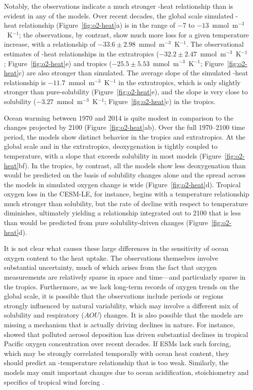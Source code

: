 \documentclass[draft,linenumbers]{report_chapter}
\begin{document}
Notably, the observations indicate a much stronger -heat relationship than is evident in any of the models.
Over recent decades, the global scale simulated -heat relationship (Figure~\ref{fig:o2-heat}a) is in the range of $-7$ to $-13$~mmol~m$^{-3}$~K$^{-1}$; the observations, by contrast, show much more  loss for a given temperature increase, with a relationship of $-33.6\pm2.98$~mmol~m$^{-3}$~K$^{-1}$.
The observational estimates of -heat relationships in the extratropics ($-32.2\pm2.47$~mmol~m$^{-3}$~K$^{-1}$; Figure~\ref{fig:o2-heat}e) and tropics ($-25.5\pm5.53$~mmol~m$^{-3}$~K$^{-1}$; Figure~\ref{fig:o2-heat}c) are also stronger than simulated.
The average slope of the simulated -heat relationship is $-11.7$~mmol~m$^{-3}$~K$^{-1}$ in the extratropics, which is only slightly stronger than pure-solubility (Figure~\ref{fig:o2-heat}e), and the slope is very close to solubility ($-3.27$~mmol~m$^{-3}$~K$^{-1}$; Figure~\ref{fig:o2-heat}c) in the tropics.

Ocean warming between 1970 and 2014 is quite modest in comparison to the changes projected by 2100 (Figure~\ref{fig:o2-heat}ab).
Over the full 1970--2100 time period, the models show distinct behavior in the tropics and extratropics.
At the global scale and in the extratropics, deoxygenation is tightly coupled to temperature, with a slope that exceeds solubility in most models (Figure~\ref{fig:o2-heat}bf).
In the tropics, by contrast, all the models show less deoxygenation than would be predicted on the basis of solubility changes alone and the spread across the models in simulated oxygen change is wide (Figure~\ref{fig:o2-heat}d).
Tropical oxygen loss in the CESM-LE, for instance, begins with a temperature relationship much stronger than solubility, but the rate of decline with respect to temperature diminishes, ultimately yielding a relationship integrated out to 2100 that is less than would be predicted from pure solubility-driven changes (Figure~\ref{fig:o2-heat}d).

It is not clear what causes these large differences in the sensitivity of ocean oxygen content to the heat uptake.
The observations themselves involve substantial uncertainty, much of which arises from the fact that oxygen measurements are relatively sparse in space and time---and particularly sparse in the tropics.
Furthermore, as we lack long-term records of oxygen trends on the global scale, it is possible that the observations include periods or regions strongly influenced by natural variability, which may involve a different mix of solubility and respiratory ($AOU$) changes.
It is also possible that the models are missing a mechanism that is actually driving  declines in nature.
For instance, \citet{Ito-Nenes-etal-2016} showed that polluted aerosol deposition has driven substantial declines in tropical Pacific oxygen concentration over recent decades.
If ESMs lack such forcing, which may be strongly correlated temporally with ocean heat content, they should predict an -temperature relationship that is too weak.
Similarly, the models may omit important changes due to ocean acidification, stoichiometry and specifics of tropical wind forcing \citep[][and references therein]{Oschlies-Duteil-etal-2017}.
\end{document}
